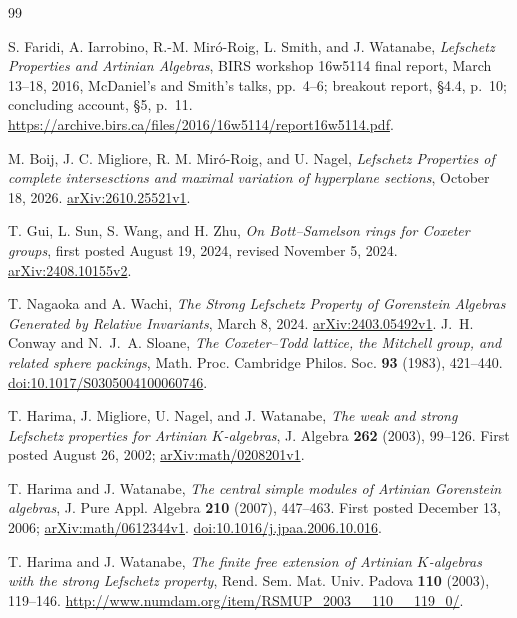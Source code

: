 \documentclass[11pt]{article}
\theoremstyle{definition}
\begin{document}
\begin{thebibliography}{99}

S. Faridi, A. Iarrobino, R.-M. Mir\'o-Roig, L. Smith, and J. Watanabe,
\emph{Lefschetz Properties and Artinian Algebras},
BIRS workshop 16w5114 final report, March 13--18, 2016,
McDaniel's and Smith's talks, pp.~4--6; breakout report, \S4.4, p.~10;
concluding account, \S5, p.~11.
\url{https://archive.birs.ca/files/2016/16w5114/report16w5114.pdf}.

M. Boij, J. C. Migliore, R. M. Mir\'o-Roig, and U. Nagel,
\emph{Lefschetz Properties of complete intersesctions and maximal variation of hyperplane sections},
October 18, 2026.
\href{https://arxiv.org/abs/2610.25521v1}{arXiv:2610.25521v1}.

T. Gui, L. Sun, S. Wang, and H. Zhu,
\emph{On Bott--Samelson rings for Coxeter groups},
first posted August 19, 2024, revised November 5, 2024.
\href{https://arxiv.org/abs/2408.10155v2}{arXiv:2408.10155v2}.

T. Nagaoka and A. Wachi,
\emph{The Strong Lefschetz Property of Gorenstein Algebras Generated by Relative Invariants},
March 8, 2024.
\href{https://arxiv.org/abs/2403.05492v1}{arXiv:2403.05492v1}.
J.~H. Conway and N.~J.~A. Sloane,
\emph{The Coxeter--Todd lattice, the Mitchell group, and related sphere packings},
Math. Proc. Cambridge Philos. Soc. \textbf{93} (1983), 421--440.
\href{https://doi.org/10.1017/S0305004100060746}{doi:10.1017/S0305004100060746}.

T. Harima, J. Migliore, U. Nagel, and J. Watanabe,
\emph{The weak and strong Lefschetz properties for Artinian $K$-algebras},
J. Algebra \textbf{262} (2003), 99--126.
First posted August 26, 2002;
\href{https://arxiv.org/abs/math/0208201v1}{arXiv:math/0208201v1}.

T. Harima and J. Watanabe,
\emph{The central simple modules of Artinian Gorenstein algebras},
J. Pure Appl. Algebra \textbf{210} (2007), 447--463.
First posted December 13, 2006;
\href{https://arxiv.org/abs/math/0612344v1}{arXiv:math/0612344v1}.
\href{https://doi.org/10.1016/j.jpaa.2006.10.016}{doi:10.1016/j.jpaa.2006.10.016}.

T. Harima and J. Watanabe,
\emph{The finite free extension of Artinian $K$-algebras with the strong Lefschetz property},
Rend. Sem. Mat. Univ. Padova \textbf{110} (2003), 119--146.
\url{http://www.numdam.org/item/RSMUP_2003__110__119_0/}.


\end{thebibliography}
\end{document}
